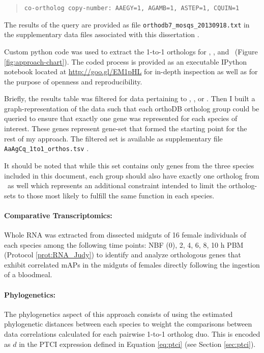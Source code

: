 \begin{quotation}
    \texttt{co-ortholog copy-number: AAEGY=1, AGAMB=1, ASTEP=1, CQUIN=1}
\end{quotation}



The results of the query are provided as file \texttt{orthodb7\_mosqs\_20130918.txt} in the supplementary data files associated with this dissertation \cite{Dunn2013dissSupl}.
 
Custom python code was used to extract the 1-to-1 orthologs for \Aa, \Ag, and \Cq\ (Figure \ref{fig:approach-chart}).
The coded process is provided as an executable IPython notebook located at \url{http://goo.gl/EM1pHL} for in-depth inspection as well as for the purpose of openness and reproducibility.

Briefly, the results table was filtered for data pertaining to \Aa, \Ag, or \Cq.
Then I built a graph-representation of the data such that each orthoDB ortholog group could be queried to ensure that exactly one gene was represented for each species of interest.
These genes represent gene-set that formed the starting point for the rest of my approach.
The filtered set is available as supplementary file \texttt{AaAgCq\_1to1\_orthos.tsv} \cite{Dunn2013dissSupl}.

It should be noted that while this set contains only genes from the three species included in this document, each group should also have exactly one ortholog from \As\ as well which represents an additional constraint intended to limit the ortholog-sets to those most likely to fulfill the same function in each species.

\paragraph*{Comparative Transcriptomics:}

Whole RNA was extracted from dissected midguts of 16 female individuals of each species among the following time points: \gls{NBF} (0), 2, 4, 6, 8, 10 h \gls{PBM} (Protocol \ref{prot:RNA_Judy}) to identify and analyze orthologous genes that exhibit correlated \glspl{mAP} in the midguts of females directly following the ingestion of a bloodmeal.


\paragraph*{Phylogenetics:}

The phylogenetics aspect of this approach consists of using the estimated phylogenetic distances between each species to weight the comparisons between data correlations calculated for each pairwise 1-to-1 ortholog duo.
This is encoded as $d$ in the \gls{PTCI} expression defined in Equation \ref{eq:ptci} (see Section \ref{sec:ptci}).

